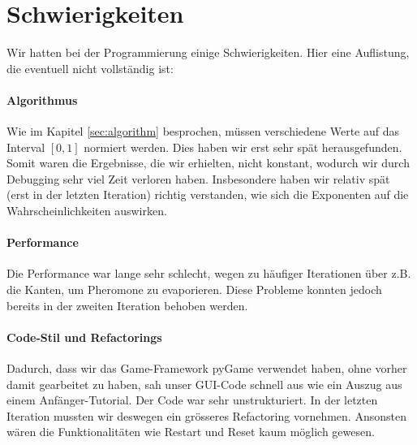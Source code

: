 \section{Schwierigkeiten}

Wir hatten bei der Programmierung einige Schwierigkeiten. Hier eine Auflistung,
die eventuell nicht vollständig ist:

\paragraph*{Algorithmus}

Wie im Kapitel \ref{sec:algorithm} besprochen, müssen verschiedene Werte auf das
Interval $[0,1]$ normiert werden. Dies haben wir erst sehr spät herausgefunden.
Somit waren die Ergebnisse, die wir erhielten, nicht konstant, wodurch wir durch
Debugging sehr viel Zeit verloren haben. Insbesondere haben wir relativ spät
(erst in der letzten Iteration) richtig verstanden, wie sich die Exponenten auf
die Wahrscheinlichkeiten auswirken.

\paragraph*{Performance}

Die Performance war lange sehr schlecht, wegen zu häufiger Iterationen über z.B.
die Kanten, um Pheromone zu evaporieren. Diese Probleme konnten jedoch bereits
in der zweiten Iteration behoben werden.

\paragraph*{Code-Stil und Refactorings}

Dadurch, dass wir das Game-Framework pyGame verwendet haben, ohne vorher damit
gearbeitet zu haben, sah unser GUI-Code schnell aus wie ein Auszug aus einem
Anfänger-Tutorial. Der Code war sehr unstrukturiert. In der letzten Iteration
mussten wir deswegen ein grösseres Refactoring vornehmen. Ansonsten wären die
Funktionalitäten wie Restart und Reset kaum möglich gewesen.

